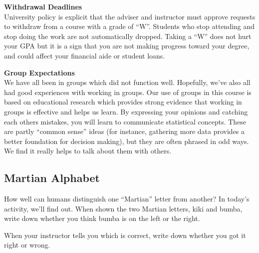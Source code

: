   {\bf Withdrawal Deadlines  }\\
 University policy is explicit that the adviser and instructor must
 approve requests to withdraw from a course with a grade of ``W''. 
 Students who stop attending and stop doing the work are not
 automatically dropped.  Taking a ``W'' does not hurt your GPA but it
 is a sign that you are not making progress toward your degree, and
 could affect your financial aide or student loans. 


 {\bf Group Expectations }\\
 We have all been in groups which did not function well.  Hopefully,
 we've also all had good experiences with working in groups.  Our use
 of groups in this course is based on educational research which
 provides strong evidence that working in groups is effective and helps
 us learn.  By expressing your opinions and catching each others
 mistakes, you will learn to communicate statistical concepts.  These
 are partly ``common sense''
 ideas (for instance, gathering more data provides a better foundation
 for decision making),  but they are often  phrased in
 odd ways. We find it really helps to talk about them  with
 others. 



\newpage
 \def\theTopic{Martian Alphabet}


\subsection{  Martian Alphabet }


How well can humans distinguish one ``Martian'' letter from another?
In today's activity, we'll find out.
When shown the two Martian letters, kiki and bumba, write down whether
you think bumba is on the left or the right. \vspace{.5cm}


When your instructor  tells you which is correct, write down whether
you got it right or wrong. \vspace{.5cm}


